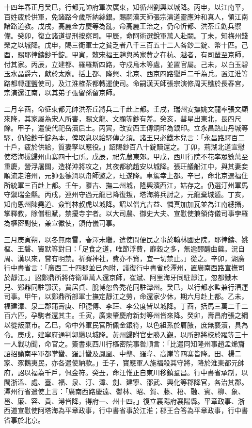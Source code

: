 \begin{pinyinscope}
 十四年春正月癸巳，行都元帥府軍次廣東，知循州劉興以城降。丙申，以江南平，百姓疲於供軍，免諸路今歲所納絲銀。賜嗣漢天師張宗演道靈應沖和真人，領江南諸路道教。戊戌，高麗金方慶等為亂，命高麗王治之，仍命忻都、洪茶丘飭兵禦備。癸卯，復立諸道提刑按察司。甲辰，命阿術選銳軍萬人赴闕。丁未，知梅州錢榮之以城降。戊申，賜三衛軍士之貧乏者八千三百五十二人各鈔二錠、幣十匹。己酉，賜耶律鑄鈔千錠。甲寅，敕宋福王趙與芮家貲之在杭、越者，有司輦至京師，付其家。丙辰，立建都、羅羅斯四路，守戍烏木等處，並置官屬。己未，以白玉碧玉水晶爵六，獻於太廟。括上都、隆興、北京、西京四路獵戶二千為兵。置江淮等路都轉運鹽使司，及江淮榷茶都轉運使司。命嗣漢天師張宗演修周天醮於長春宮，宗演還江南，以其弟子張留孫留京師。



 二月辛酉，命征東都元帥洪茶丘將兵二千赴上都。壬戌，瑞州安撫姚文龍率張文顯來降，其家屬為宋人所害，賜文龍、文顯等鈔有差。癸亥，彗星出東北，長四尺餘。甲子，遣使代祀岳瀆后土。丙寅，改安西王傅銅印為銀印。立永昌路山丹城等驛，仍給鈔千錠為本，俾取息以給驛傳之須。諸王只必鐵木兒言：「永昌路驛百二十戶，疲於供給，質妻孥以應役。」詔賜鈔百八十錠贖還之。丁卯，荊湖北道宣慰使塔海拔歸州山寨四十七所。戊辰，祀先農東郊。甲戌，西川行院不花率眾數萬至重慶，營浮屠關，造梯沖將攻之，其夜都統趙安以城降。張玨艤船江中，與其妻妾順流走涪州，元帥張德潤以舟師邀之，玨遂降。車駕幸上都。辛巳，命北京選福住所統軍三百赴上都。壬午，隳吉、撫二州城，隆興濱西江，姑存之。仍選汀州軍馬守禦瑞金縣。丙戌，連州守過元龍已降復叛，塔海將兵討之，元龍棄城遁。丁亥，知南恩州陳堯道、僉判林叔虎以城降。詔以僧亢吉益、憐真加加瓦並為江南總攝，掌釋教，除僧租賦，禁擾寺宇者。以大司農、御史大夫、宣慰使兼領侍儀司事孛羅為樞密副使，兼宣徽使，領侍儀司事。



 三月庚寅朔，以冬無雨雪，春澤未繼，遣使問便民之事於翰林國史院，耶律鑄、姚樞、王磐、竇默等對曰：「足食之道，唯節浮費，靡穀之多，無逾醪醴曲糵。況自周、漢以來，嘗有明禁。祈賽神社，費亦不貲，宜一切禁止。」從之。辛卯，湖廣行中書省言：「廣西二十四郡並已內附，議復行中書省於潭州，置廣南西路宣撫司於靜江。」詔鄭鼎所將侍衛軍萬人還京師，崔斌、阿里海牙同駐靜江，忽都鐵木兒、鄭鼎同駐鄂漢，賈居貞、脫博忽魯禿花同駐潭州。癸巳，以行都水監兼行漕運司事。甲午，以鄭鼎所部軍士撫定靜江之勞，命還家少休，期六月赴上都。乙未，福建漳、泉二郡蒲壽庚、印德傅、李玨、李公度皆以城降。丁酉，括馬三萬二千二百六匹，孕駒者還其主。壬寅，廣東肇慶府新封等州皆來降。癸卯，壽昌府張之綱以從叛棄市。乙巳，命中外軍民官所佩金銀符，以色組系於肩腋，庶無褻瀆，具為令。庚戌，建寧府通判郭纘以城降。黃州歸附官史勝入覲，以所部將校於躍等三十一人戰功聞，命官之。簽書東西川行樞密院事昝順言：「比遣同知隆州事趙孟烯齎詔招諭南平軍都掌蠻、羅計蠻及鳳凰、中壟、羅韋、高崖等四寨皆降。田、楊二家、豕鵝夷民，亦各遣使納款。」壬子，寶應軍人施福殺其守將，降於淮東都元帥府，詔以福為千戶，佩金符。癸丑，命汪惟正自東川移鎮鞏昌。行中書省承制，以閩浙溫、處、臺、福、泉、汀、漳、劍、建寧、邵武、興化等郡降官，各治其郡。潭州行省遣使上言：「廣南西路慶遠、鬱林、昭、賀、藤、梧、融、賓、柳、象、邕、廉、容、貴、潯皆降，得府一、州十四。」復立襄陽府襄陽縣。平章政事、浙西道宣慰使阿塔海為平章政事，行中書省事於江淮；郡王合答為平章政事，行中書省事於北京。




\end{pinyinscope}
